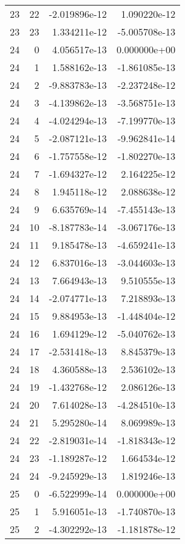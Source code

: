 \begin{tabular}{rrrr}
  23 &   22 & -2.019896e-12 &  1.090220e-12 \\
  23 &   23 &  1.334211e-12 & -5.005708e-13 \\
  24 &    0 &  4.056517e-13 &  0.000000e+00 \\
  24 &    1 &  1.588162e-13 & -1.861085e-13 \\
  24 &    2 & -9.883783e-13 & -2.237248e-12 \\
  24 &    3 & -4.139862e-13 & -3.568751e-13 \\
  24 &    4 & -4.024294e-13 & -7.199770e-13 \\
  24 &    5 & -2.087121e-13 & -9.962841e-14 \\
  24 &    6 & -1.757558e-12 & -1.802270e-13 \\
  24 &    7 & -1.694327e-12 &  2.164225e-12 \\
  24 &    8 &  1.945118e-12 &  2.088638e-12 \\
  24 &    9 &  6.635769e-14 & -7.455143e-13 \\
  24 &   10 & -8.187783e-14 & -3.067176e-13 \\
  24 &   11 &  9.185478e-13 & -4.659241e-13 \\
  24 &   12 &  6.837016e-13 & -3.044603e-13 \\
  24 &   13 &  7.664943e-13 &  9.510555e-13 \\
  24 &   14 & -2.074771e-13 &  7.218893e-13 \\
  24 &   15 &  9.884953e-13 & -1.448404e-12 \\
  24 &   16 &  1.694129e-12 & -5.040762e-13 \\
  24 &   17 & -2.531418e-13 &  8.845379e-13 \\
  24 &   18 &  4.360588e-13 &  2.536102e-13 \\
  24 &   19 & -1.432768e-12 &  2.086126e-13 \\
  24 &   20 &  7.614028e-13 & -4.284510e-13 \\
  24 &   21 &  5.295280e-14 &  8.069989e-13 \\
  24 &   22 & -2.819031e-14 & -1.818343e-12 \\
  24 &   23 & -1.189287e-12 &  1.664534e-12 \\
  24 &   24 & -9.245929e-13 &  1.819246e-13 \\
  25 &    0 & -6.522999e-14 &  0.000000e+00 \\
  25 &    1 &  5.916051e-13 & -1.740870e-13 \\
  25 &    2 & -4.302292e-13 & -1.181878e-12 \\

\end{tabular}
